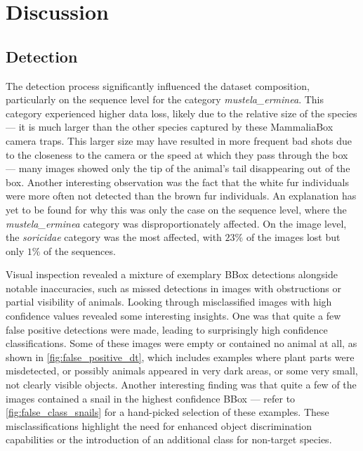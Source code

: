 


\section{Discussion}
\label{discussion}

\subsection{Detection}
The detection process significantly influenced the dataset composition, particularly on the sequence level for the category \textit{mustela\_erminea}.
This category experienced higher data loss, likely due to the relative size of the species --- it is much larger than the other species captured by these MammaliaBox camera traps.
This larger size may have resulted in more frequent bad shots due to the closeness to the camera or the speed at which they pass through the box --- many images showed only the tip of the animal's tail disappearing out of the box.
Another interesting observation was the fact that the white fur individuals were more often not detected than the brown fur individuals.
An explanation has yet to be found for why this was only the case on the sequence level, where the \textit{mustela\_erminea} category was disproportionately affected.
On the image level, the \textit{soricidae} category was the most affected, with \(23\%\) of the images lost but only \(1\%\) of the sequences.

Visual inspection revealed a mixture of exemplary BBox detections alongside notable inaccuracies, such as missed detections in images with obstructions or partial visibility of animals.
Looking through misclassified images with high confidence values revealed some interesting insights.
One was that quite a few false positive detections were made, leading to surprisingly high confidence classifications.
Some of these images were empty or contained no animal at all, as shown in \autoref{fig:false_positive_dt}, which includes examples where plant parts were misdetected, or possibly animals appeared in very dark areas, or some very small, not clearly visible objects.
Another interesting finding was that quite a few of the images contained a snail in the highest confidence BBox --- refer to \autoref{fig:false_class_snails} for a hand-picked selection of these examples.
These misclassifications highlight the need for enhanced object discrimination capabilities or the introduction of an additional class for non-target species.

